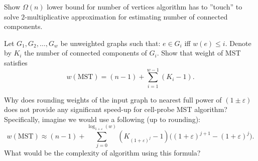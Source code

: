 \documentclass[12pt]{uebung}
\begin{document}
 

\newcommand{\bigo}{\mathcal{O}}
\renewcommand{\aufgname}{Exercise}
\begin{aufg}
Show $\Omega(n)$ lower bound for number of vertices algorithm has to ''touch'' to solve $2$-multiplicative approximation for estimating number of connected components.
\end{aufg}

\begin{aufg}
Let $G_1,G_2,\ldots,G_w$ be unweighted graphs such that: $e \in G_i$ iff $w(e) \le i$. Denote by $K_i$ the number of connected components of $G_i$.
Show that weight of MST satisfies
$$w(\text{MST}) = (n-1) + \sum_{i=1}^{w-1} (K_i - 1).$$
\end{aufg}

\begin{aufg}
Why does rounding weights of the input graph to nearest full power of $(1\pm \varepsilon)$ does not provide any significant speed-up for cell-probe MST algorithm? Specifically, imagine we would use a following (up to rounding):
$$w(\text{MST}) \approx (n-1) + \sum_{j=0}^{\log_{1+\varepsilon}(w)} (K_{(1+\varepsilon)^j}-1)\Big((1+\varepsilon)^{j+1}-(1+\varepsilon)^j\Big).$$
What would be the complexity of algorithm using this formula?
\end{aufg}
\end{document}

